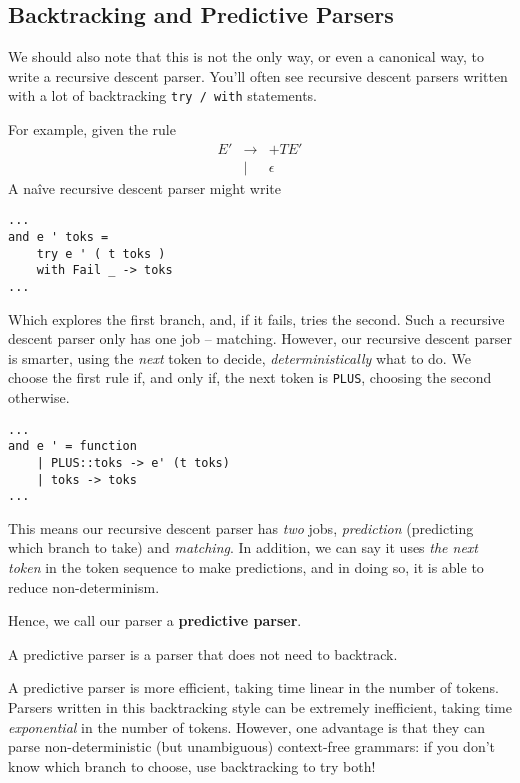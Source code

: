 \subsection{Backtracking and Predictive Parsers}
We should also note that this is not the only way, or even a canonical way, to write a recursive descent parser. You'll often see recursive descent parsers written with a lot of backtracking \texttt{try / with} statements.

For example, given the rule 
\[
\begin{array}{rcl}
     E'&\to&+TE'  \\
     &\mid&\epsilon
\end{array}
\]
A naîve recursive descent parser might write 
\begin{verbatim}
...
and e ' toks = 
    try e ' ( t toks )
    with Fail _ -> toks
...
\end{verbatim}
Which explores the first branch, and, if it fails, tries the second. Such a recursive descent parser only has one job -- matching. However, our recursive descent parser is smarter, using the \textit{next} token to decide, \textit{deterministically} what to do. We choose the first rule if, and only if, the next token is \texttt{PLUS}, choosing the second otherwise. 
\begin{verbatim}
...
and e ' = function 
    | PLUS::toks -> e' (t toks)
    | toks -> toks
...
\end{verbatim}
This means our recursive descent parser has \textit{two} jobs, \textit{prediction} (predicting which branch to take) and \textit{matching}. In addition, we can say it uses \textit{the next token} in the token sequence to make predictions, and in doing so, it is able to reduce non-determinism.

Hence, we call our parser a \textbf{predictive parser}.

\begin{definition}
    A predictive parser is a parser that does not need to backtrack.
\end{definition}

A predictive parser is more efficient, taking time linear in the number of tokens. Parsers written in this backtracking style can be extremely inefficient, taking time \textit{exponential} in the number of tokens. However, one advantage is that they can parse non-deterministic (but unambiguous) context-free grammars: if you don't know which branch to choose, use backtracking to try both!


